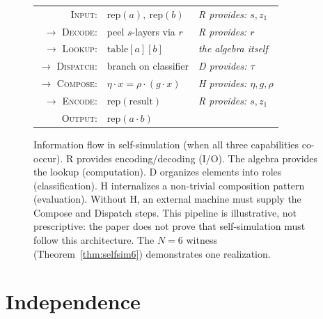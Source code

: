 \documentclass[sigconf,screen]{acmart}
\newcommand{\dotop}{\cdot}
\theoremstyle{remark}
\begin{document}
\begin{figure}[t]
\centering
\begin{tabular}{@{}r@{~}l@{\quad}l@{}}
\textsc{Input}: & $\text{rep}(a),\ \text{rep}(b)$ & \emph{R provides: $s, z_1$} \\
$\to$ \textsc{Decode}: & peel $s$-layers via $r$ & \emph{R provides: $r$} \\
$\to$ \textsc{Lookup}: & $\text{table}[a][b]$ & \emph{the algebra itself} \\
$\to$ \textsc{Dispatch}: & branch on classifier & \emph{D provides: $\tau$} \\
$\to$ \textsc{Compose}: & $\eta \dotop x = \rho \dotop (g \dotop x)$ & \emph{H provides: $\eta, g, \rho$} \\
$\to$ \textsc{Encode}: & $\text{rep}(\text{result})$ & \emph{R provides: $s, z_1$} \\
\textsc{Output}: & $\text{rep}(a \dotop b)$ & \\
\end{tabular}
\caption{Information flow in self-simulation (when all three capabilities co-occur). R provides encoding/decoding (I/O). The algebra provides the lookup (computation). D organizes elements into roles (classification). H internalizes a non-trivial composition pattern (evaluation). Without H, an external machine must supply the Compose and Dispatch steps. This pipeline is illustrative, not prescriptive: the paper does not prove that self-simulation must follow this architecture. The $N\!=\!6$ witness (Theorem~\ref{thm:selfsim6}) demonstrates one realization.}
\label{fig:flow}
\end{figure}

\section{Independence}
\label{sec:independence}
\end{document}
